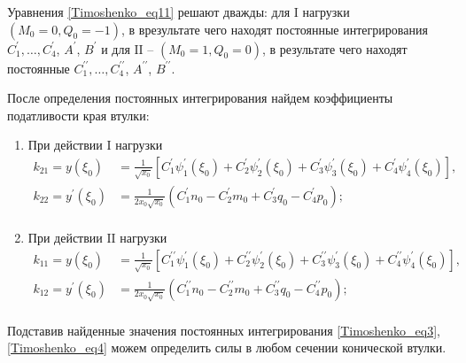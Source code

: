 Уравнения \eqref{Timoshenko_eq11} решают дважды: для ${\text{I}}$ нагрузки $\left (M_0=0, Q_0=-1 \right )$, в врезультате чего находят постоянные интегрирования $C_1^{\prime}, \ldots,C_4^{\prime}$, $A^{\prime}$, $B^{\prime}$ и для ${\text{II}}$ -- $\left (M_0=1, Q_0=0 \right )$, в результате чего находят постоянные $C_1^{\prime \prime}, \ldots,C_4^{\prime \prime}$, $A^{\prime \prime}$, $B^{\prime \prime}$.

После определения постоянных интегрирования найдем коэффициенты податливости края втулки:
\begin{enumerate}
  \item При действии ${\text{I}}$ нагрузки
  \begin{equation}
    \label{Timoshenko_eq12}
    \begin{split}
      k_{21}=y({\xi}_0)&=\frac{1}{\sqrt{x_0}} \left[ C_1^{\prime} \psi_1^{\prime}({\xi}_0) +C_2^{\prime} \psi_2^{\prime}({\xi}_0)+C_3^{\prime} \psi_3^{\prime}({\xi}_0)+C_4^{\prime} \psi_4^{\prime}({\xi}_0) \right],\\
      k_{22}=y^{\prime}({\xi}_0)&=\frac{1}{2x_0 \sqrt{x_0}} \left(C_1^{\prime} n_0-C_2^{\prime} m_0+C_3^{\prime} q_0-C_4^{\prime} p_0 \right);\\
    \end{split}  
  \end{equation}
  \item При действии ${\text{II}}$ нагрузки
  \begin{equation}
    \label{Timoshenko_eq13}
    \begin{split}
      k_{11}=y({\xi}_0)&=\frac{1}{\sqrt{x_0}} \left[ C_1^{\prime \prime} \psi_1^{\prime}({\xi}_0) +C_2^{\prime \prime} \psi_2^{\prime}({\xi}_0)+C_3^{\prime \prime} \psi_3^{\prime}({\xi}_0)+C_4^{\prime \prime} \psi_4^{\prime}({\xi}_0) \right],\\
      k_{12}=y^{\prime}({\xi}_0)&=\frac{1}{2x_0 \sqrt{x_0}} \left(C_1^{\prime \prime} n_0-C_2^{\prime \prime} m_0+C_3^{\prime \prime} q_0-C_4^{\prime \prime} p_0 \right);\\
    \end{split}  
  \end{equation}
  \end{enumerate}

Подставив найденные значения постоянных интегрирования \eqref{Timoshenko_eq3}, \eqref{Timoshenko_eq4} можем определить силы в любом сечении конической втулки.





